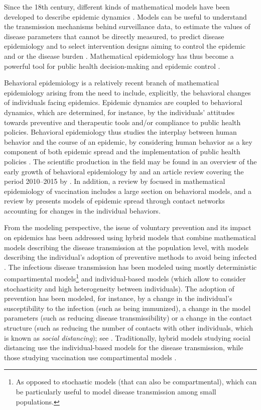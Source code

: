Since the 18th century, different kinds of mathematical models have been developed to describe epidemic dynamics \cite[]{Brauer2017}. Models can be useful to understand the transmission mechanisms behind surveillance data, to estimate the values of disease parameters that cannot be directly measured, to predict disease epidemiology and to select intervention designs aiming to control the epidemic and or the disease burden \cite[]{Valleron2000}. Mathematical epidemiology has thus become a powerful tool for public health decision-making and epidemic control \cite[]{Valleron2000}. 

Behavioral epidemiology is a relatively recent branch of mathematical epidemiology arising from the need to include, explicitly, the behavioral changes of individuals facing epidemics. Epidemic dynamics are coupled to behavioral dynamics, which are determined, for instance, by the individuals' attitudes towards preventive and therapeutic tools and/or compliance to public health policies. Behavioral epidemiology thus studies the interplay between human behavior and the course of an epidemic, by considering human behavior as a key component of both epidemic spread and the implementation of public health policies \cite[]{Bauch2013}. The scientific production in the field may be found in an overview of the early growth of behavioral epidemiology by \cite{Bauch2013} and an article review covering the period 2010--2015 by \cite{Verelst2016}. In addition, a review by \cite{Wang2016} focused in mathematical epidemiology of vaccination includes a large section on behavioral models, and a review by \cite{Wang2015} presents models of epidemic spread through contact networks accounting for changes in the individual behaviors.%

From the modeling perspective, the issue of voluntary prevention and its impact on epidemics has been addressed using hybrid models that combine mathematical models describing the disease transmission at the population level, with models describing the individual's adoption of preventive methods to avoid being infected \cite[]{Verelst2016}. The infectious disease transmission has been modeled using mostly deterministic compartimental models\footnote{As opposed to stochastic models (that can also be compartmental), which can be particularly useful to model disease transmission among small populations.}  and individual-based models (which allow to consider stochasticity and high heterogeneity between individuals). The adoption of prevention has been modeled, for instance, by a change in the individual's susceptibility to the infection (such as being immunized), a change in the model parameters (such as reducing disease transmissibility) or a change in the contact structure (such as reducing the number of contacts with other individuals, which is known as \textit{social distancing}); see \cite{Verelst2016}. Traditionally, hybrid models studying social distancing use the individual-based models for the disease transmission, while those studying vaccination use compartimental models \cite[]{Verelst2016}.

